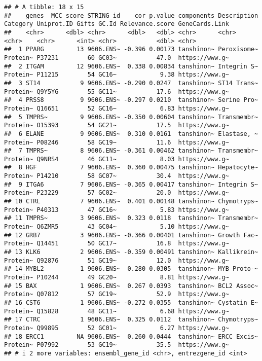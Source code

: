 \documentclass[
]{article}
\begin{document}
\begin{verbatim}
## # A tibble: 18 x 15
##    genes  MCC_score STRING_id    cor p.value components Description Category Uniprot.ID Gifts GC.Id Relevance.score GeneCards.Link
##    <chr>      <dbl> <chr>      <dbl>   <dbl> <chr>      <chr>       <chr>    <chr>      <int> <chr>           <dbl> <chr>         
##  1 PPARG         13 9606.ENS~ -0.396 0.00173 tanshinon~ Peroxisome~ Protein~ P37231        60 GC03~           47.0  https://www.g~
##  2 ITGAM         12 9606.ENS~  0.338 0.00834 tanshinon~ Integrin S~ Protein~ P11215        54 GC16~            9.38 https://www.g~
##  3 ST14           9 9606.ENS~ -0.290 0.0247  tanshinon~ ST14 Trans~ Protein~ Q9Y5Y6        55 GC11~           17.6  https://www.g~
##  4 PRSS8          9 9606.ENS~ -0.297 0.0210  tanshinon~ Serine Pro~ Protein~ Q16651        52 GC16~            6.83 https://www.g~
##  5 TMPRS~         9 9606.ENS~ -0.350 0.00604 tanshinon~ Transmembr~ Protein~ O15393        54 GC21~           17.5  https://www.g~
##  6 ELANE          9 9606.ENS~  0.310 0.0161  tanshinon~ Elastase, ~ Protein~ P08246        58 GC19~           11.6  https://www.g~
##  7 TMPRS~         8 9606.ENS~ -0.361 0.00462 tanshinon~ Transmembr~ Protein~ Q9NRS4        46 GC11~            8.03 https://www.g~
##  8 HGF            7 9606.ENS~  0.360 0.00475 tanshinon~ Hepatocyte~ Protein~ P14210        58 GC07~           30.4  https://www.g~
##  9 ITGA6          7 9606.ENS~ -0.365 0.00417 tanshinon~ Integrin S~ Protein~ P23229        57 GC02~           20.0  https://www.g~
## 10 CTRL           7 9606.ENS~  0.401 0.00148 tanshinon~ Chymotryps~ Protein~ P40313        47 GC16~            5.83 https://www.g~
## 11 TMPRS~         3 9606.ENS~  0.323 0.0118  tanshinon~ Transmembr~ Protein~ Q6ZMR5        43 GC04~            5.10 https://www.g~
## 12 GRB7           3 9606.ENS~ -0.366 0.00401 tanshinon~ Growth Fac~ Protein~ Q14451        50 GC17~           16.8  https://www.g~
## 13 KLK6           2 9606.ENS~ -0.359 0.00491 tanshinon~ Kallikrein~ Protein~ Q92876        51 GC19~           12.0  https://www.g~
## 14 MYBL2          1 9606.ENS~  0.280 0.0305  tanshinon~ MYB Proto-~ Protein~ P10244        49 GC20~            8.81 https://www.g~
## 15 BAX            1 9606.ENS~  0.267 0.0393  tanshinon~ BCL2 Assoc~ Protein~ Q07812        57 GC19~           52.9  https://www.g~
## 16 CST6           1 9606.ENS~ -0.272 0.0355  tanshinon~ Cystatin E~ Protein~ Q15828        48 GC11~            6.68 https://www.g~
## 17 CTRC           1 9606.ENS~  0.325 0.0112  tanshinon~ Chymotryps~ Protein~ Q99895        52 GC01~            6.27 https://www.g~
## 18 ERCC1         NA 9606.ENS~  0.260 0.0444  tanshinon~ ERCC Excis~ Protein~ P07992        53 GC19~           35.5  https://www.g~
## # i 2 more variables: ensembl_gene_id <chr>, entrezgene_id <int>
\end{verbatim}
\end{document}
